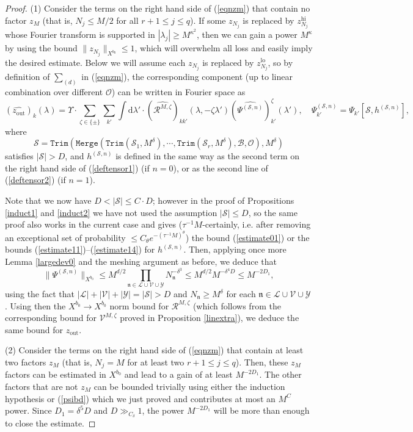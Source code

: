 \documentclass[11 pt,reqno]{amsart}
\theoremstyle{definition}
\theoremstyle{remark}
\numberwithin{equation}{section}
\newcommand{\Sc}{\mathcal{S}}
\newcommand{\Lc}{\mathcal{L}}
\newcommand{\Vc}{\mathcal{V}}
\newcommand{\Yc}{\mathcal{Y}}
\newcommand{\nf}{\mathfrak{n}}
\newcommand{\Bs}{\mathscr{B}}
\newcommand{\Os}{\mathscr{O}}
\newcommand{\Rs}{\mathscr{R}}
\newcommand{\Vs}{\mathscr{V}}
\begin{document}
{\begin{proof}
(1) Consider the terms on the right hand side of (\ref{eqnzm}) that contain no factor $z_M$ (that is, $N_j\leq M/2$ for all $r+1\leq j\leq q$). If some $z_{N_j}$ is replaced by $z_{N_j}^{\mathrm{hi}}$ whose Fourier transform is supported in $|\lambda_j|\geq M^{\kappa^2}$, then we can gain a power $M^\kappa$ by using the bound $\|z_{N_j}\|_{X^{b_0}}\leq 1$, which will overwhelm all loss and easily imply the desired estimate. Below we will assume each $z_{N_j}$ is replaced by $z_{N_j}^{\mathrm{lo}}$, so by definition of $\sum_{(d)}$ in (\ref{eqnzm}), the corresponding component (up to linear combination over different $\Os$) can be written in Fourier space as 
\[(\widehat{z_{\mathrm{out}}})_k(\lambda)=\Upsilon\cdot\sum_{\zeta\in\{\pm\}}\sum_{k'}\int\mathrm{d}\lambda'\cdot(\widehat{\Rs^{M,\zeta}})_{kk'}(\lambda,-\zeta\lambda')(\widehat{\Psi^{(\Sc,n)}})_{k'}^\zeta(\lambda'),\quad \Psi_{k'}^{(\Sc,n)}=\Psi_{k'}[\Sc,h^{(\Sc,n)}],\] where
\[\Sc=\mathtt{Trim}(\mathtt{Merge}(\mathtt{Trim}(\Sc_1,M^\delta),\cdots,\mathtt{Trim}(\Sc_r,M^\delta),\Bs,\Os),M^\delta)\] satisfies $|\Sc|>D$, and $h^{(\Sc,n)}$ is defined in the same way as the second term on the right hand side of (\ref{deftensor1}) (if $n=0$), or as the second line of (\ref{deftensor2}) (if $n=1$).

Note that we now have $D<|\Sc|\leq C\cdot D$; however in the proof of Propositions \ref{induct1} and \ref{induct2} we have not used the assumption $|\Sc|\leq D$, so the same proof also works in the current case and gives ($\tau^{-1}M$-certainly, i.e. after removing an exceptional set of probability $\leq C_\theta e^{-(\tau^{-1}M)^\theta}$) the bound (\ref{estimate01}) or the bounds (\ref{estimate11})--(\ref{estimate14}) for $h^{(\Sc,n)}$. Then, applying once more Lemma \ref{largedev0} and the meshing argument as before, we deduce that
\[\|\Psi^{(\Sc,n)}\|_{X^{b_0}}\leq M^{d/2}\prod_{\nf\in\Lc\cup\Vc\cup\Yc}N_\nf^{-\delta^3}\leq M^{d/2}M^{-\delta^4D}\leq M^{-2D_1},\] using the fact that $|\Lc|+|\Vc|+|\Yc|=|\Sc|>D$ and $N_\nf\geq M^\delta$ for each $\nf\in\Lc\cup\Vc\cup\Yc$. Using then the $X^{b_0}\to X^{b_0}$ norm bound for $\Rs^{M,\zeta}$ (which follows from the corresponding bound for $\Vs^{M,\zeta}$ proved in Proposition \ref{linextra}), we deduce the same bound for $z_{\mathrm{out}}$.

(2) Consider the terms on the right hand side of (\ref{eqnzm}) that contain at least two factors $z_M$ (that is, $N_j=M$ for at least two $r+1\leq j\leq q$). Then, these $z_M$ factors can be estimated in $X^{b_0}$ and lead to a gain of at least $M^{-2D_1}$. The other factors that are not $z_M$ can be bounded trivially using either the induction hypothesis or (\ref{psibd}) which we just proved and contributes at most an $M^{C}$ power. Since $D_1=\delta^5D$ and $D\gg_{C_\delta}1$, the power $M^{-2D_1}$ will be more than enough to close the estimate.


\end{proof}}
\end{document}
